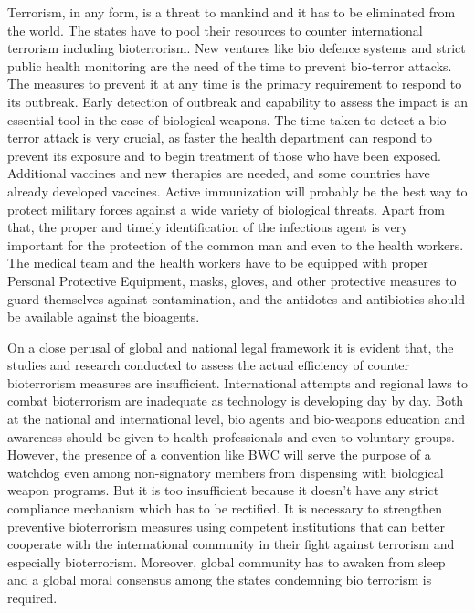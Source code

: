 \begin{multicols}{2}
\noi
Terrorism, in any form, is a threat to mankind and it has to be eliminated from the world. The
states have to pool their resources to counter international terrorism including bioterrorism.
New ventures like bio defence systems and strict public health monitoring are the need of the
time to prevent bio-terror attacks. The measures to prevent it at any time is the primary
requirement to respond to its outbreak. Early detection of outbreak and capability to assess
the impact is an essential tool in the case of biological weapons. The time taken to detect a
bio-terror attack is very crucial, as faster the health department can respond to prevent its
exposure and to begin treatment of those who have been exposed. Additional vaccines and
new therapies are needed, and some countries have already developed vaccines. Active
immunization will probably be the best way to protect military forces against a wide variety
of biological threats. Apart from that, the proper and timely identification of the infectious
agent is very important for the protection of the common man and even to the health workers.
The medical team and the health workers have to be equipped with proper Personal
Protective Equipment, masks, gloves, and other protective measures to guard themselves
against contamination, and the antidotes and antibiotics should be available against the bioagents.

\noi
On a close perusal of global and national legal framework it is evident that, the studies and
research conducted to assess the actual efficiency of counter bioterrorism measures are
insufficient. International attempts and regional laws to combat bioterrorism are inadequate
as technology is developing day by day. Both at the national and international level, bio
agents and bio-weapons education and awareness should be given to health professionals and
even to voluntary groups. However, the presence of a convention like BWC will serve the
purpose of a watchdog even among non-signatory members from dispensing with biological
weapon programs. But it is too insufficient because it doesn’t have any strict compliance
mechanism which has to be rectified. It is necessary to strengthen preventive bioterrorism
measures using competent institutions that can better cooperate with the international community in their fight against terrorism and especially bioterrorism. Moreover, global community has to awaken from sleep and a global moral consensus among the states condemning bio terrorism is required.

\end{multicols}
\label{end2020-art6}
